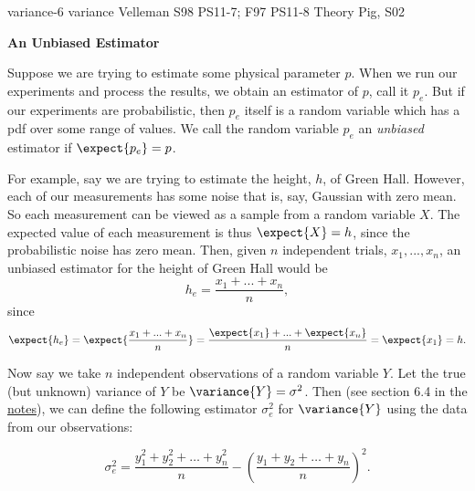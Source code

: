         \problemdata       %
        {variance-6}             %
        {variance}               %
        {Velleman}               %
        {S98 PS11-7; F97 PS11-8} %
        {Theory Pig, S02}        %

\begin{problem}
{\bf An Unbiased Estimator}

Suppose we are trying to estimate some physical parameter $p$.  When
we run our experiments and process the results, we obtain an estimator
of $p$, call it $p_e$.  But if our experiments are probabilistic, then
$p_e$ itself is a random variable which has a pdf over some range of
values.  We call the random variable $p_e$ an \emph{unbiased}
estimator if $\expect{p_e}=p$.

For example, say we are trying to estimate the height, $h$, of Green
Hall.  However, each of our measurements has some noise that is, say,
Gaussian with zero mean.  So each measurement can be viewed as a
sample from a random variable $X$.  The expected value of each
measurement is thus $\expect{X} = h$, since the probabilistic noise
has zero mean.  Then, given $n$ independent trials, $x_1, ..., x_n$,
an unbiased estimator for the height of Green Hall would be
$$h_e = \frac{x_1+...+x_n}{n},$$
since
$$\expect{h_e} = \expect{\frac{x_1+...+x_n}{n}} = \frac{\expect{x_1} + ... + \expect{x_n}}{n} = \expect{x_1}= h.$$

Now say we take $n$ independent observations of a random variable $Y$.  Let 
the true (but unknown) variance of $Y$ be $\variance{Y} = \sigma^2$.
Then (see section 6.4 in the
\href{http://theory.lcs.mit.edu/classes/6.042/fall01/lectures/l13.pdf}{notes}),
we can define the following estimator $\sigma_e^2$ for $\variance{Y}$ 
using the data from our observations:

$$\sigma_e^2 =  \frac{y_1^2 + y_2^2 + \ldots + y_n^2}{n} -
                \left(\frac{y_1 + y_2 + \ldots + y_n}{n}\right)^2.$$



\end{problem}
